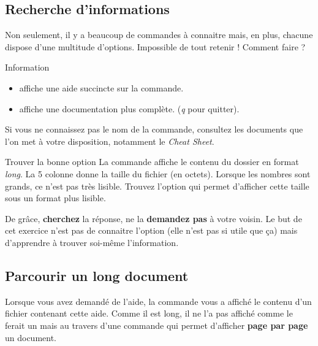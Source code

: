\documentclass[a4paper,11pt]{style-esi/td}
\begin{document}
	\subsection{Recherche d'informations}  

		Non seulement, il y a beaucoup de commandes à connaitre mais, en plus, 
		chacune dispose d'une multitude d'options. 
		Impossible de tout retenir ! Comment faire ?   

		\begin{theorie}{Information}
			\begin{itemize}
			\item 
				affiche une aide succincte sur la commande.
			\item 
				 affiche une documentation plus complète.
				(\textit{q} pour quitter).
			\end{itemize}
		\end{theorie}

		Si vous ne connaissez pas le nom de la commande,
		consultez les documents que l'on met à votre disposition,
		notamment le \textit{ Cheat Sheet}.  

		\begin{Exercice}{Trouver la bonne option} 
			La commande  
			affiche le contenu du dossier en format \textit{long}.
			La 5\ieme{} colonne donne la taille du fichier (en octets).
			Lorsque les nombres sont grands, ce n'est pas très lisible. 
			Trouvez l'option qui permet d'afficher cette taille sous un format plus lisible.  
			
			\begin{alertbox} 
				De grâce, \textbf{cherchez} la réponse, 
				ne la \textbf{demandez pas} à votre voisin. 
				Le but de cet exercice n'est pas de connaitre l'option 
				(elle n'est pas si utile que \c ca) 
				mais d'apprendre à trouver soi-même l'information.  
			\end{alertbox}
		\end{Exercice}

	\subsection{Parcourir un long document}  

		Lorsque vous avez demandé de l'aide, 
		la commande  vous a affiché 
		le contenu d'un fichier contenant cette aide.
		Comme il est long, il ne l'a pas affiché comme le ferait un 
		mais au travers d'une commande 
		qui permet d'afficher \textbf{page par page} un document.
\end{document}
